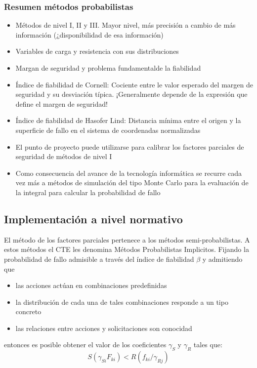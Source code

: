 \subsubsection{Resumen métodos probabilistas}
\begin{itemize}
    \item Métodos de nivel I, II y III.  Mayor nivel, más precisión a cambio de más información (¿disponibilidad de esa información)
    \item Variables de carga y resistencia con sus distribuciones
    \item Margan de seguridad y problema fundamentalde la fiabilidad
    \item Índice de fiabilidad de Cornell: Cociente entre le valor esperado del margen de seguridad y su desviación típica. ¡Generalmente depende de la expresión que define el margen de seguridad!
    \item Índice de fiabilidad de Hasofer Lind: Distancia mínima entre el origen y la superficie de fallo en el sistema de coordenadas normalizadas
    \item El punto de proyecto puede utilizarse para calibrar los factores parciales de seguridad de métodos de nivel I
    \item Como consecuencia del avance de la tecnología informática se recurre cada vez más a métodos de simulación del tipo Monte Carlo para la evaluación de la integral para calcular la probabilidad de fallo
\end{itemize}

\subsection{Implementación a nivel normativo}
El método de los factores parciales pertenece a los métodos semi-probabilistas. A estos métodos el CTE les denomina Métodos Probabilistas Implicitos. Fijando la probabilidad de fallo admisible a través del índice de fiabilidad $\beta$ y admitiendo que
\begin{itemize}
    \item las acciones actúan en combinaciones predefinidas
    \item la distribución de cada una de tales combinaciones responde a un tipo concreto 
    \item las relaciones entre acciones y solicitaciones son conocidad
\end{itemize}
entonces es posible obtener el valor de los coeficientes $\gamma_S$ y $\gamma_R$ tales que:
\[ S(\gamma_{Si} F_{ki}) < R(f_{ki} / \gamma_{Rj}) \]


